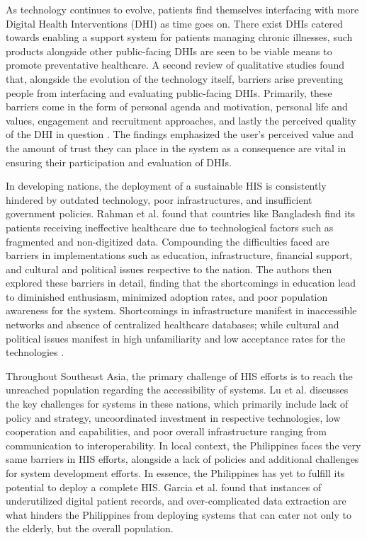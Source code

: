 \documentclass[11pt,a4paper,titlepage]{article}
\begin{document}
	As technology continues to evolve, patients find themselves interfacing with more Digital Health Interventions (DHI) as time goes on. There exist DHIs catered towards enabling a support system for patients managing chronic illnesses, such products alongside other public-facing DHIs are seen to be viable means to promote preventative healthcare. A second review of qualitative studies found that, alongside the evolution of the technology itself, barriers arise preventing people from interfacing and evaluating public-facing DHIs. Primarily, these barriers come in the form of personal agenda and motivation, personal life and values, engagement and recruitment approaches, and lastly the perceived quality of the DHI in question \cite{oconnor_2016_understanding}. The findings emphasized the user’s perceived value and the amount of trust they can place in the system as a consequence are vital in ensuring their participation and evaluation of DHIs. 
	
	In developing nations, the deployment of a sustainable HIS is consistently hindered by outdated technology, poor infrastructures, and insufficient government policies. Rahman et al. found that countries like Bangladesh find its patients receiving ineffective healthcare due to technological factors such as fragmented and non-digitized data. Compounding the difficulties faced are barriers in implementations such as education, infrastructure, financial support, and cultural and political issues respective to the nation. The authors then explored these barriers in detail, finding that the shortcomings in education lead to diminished enthusiasm, minimized adoption rates, and poor population awareness for the system. Shortcomings in infrastructure manifest in inaccessible networks and absence of centralized healthcare databases; while cultural and political issues manifest in high unfamiliarity and low acceptance rates for the technologies \cite{rahman_2024_healthcare}. 
	
	Throughout Southeast Asia, the primary challenge of HIS efforts is to reach the unreached population regarding the accessibility of systems. Lu et al. \cite{lu_2021_assessment} discusses the key challenges for systems in these nations, which primarily include lack of policy and strategy, uncoordinated investment in respective technologies, low cooperation and capabilities, and poor overall infrastructure ranging from communication to interoperability.  In local context, the Philippines faces the very same barriers in HIS efforts, alongside a lack of policies and additional challenges for system development efforts. In essence, the Philippines has yet to fulfill its potential to deploy a complete HIS. Garcia et al. \cite{garcia_2021_health} found that instances of underutilized digital patient records, and over-complicated data extraction are what hinders the Philippines from deploying systems that can cater not only to the elderly, but the overall population. 
	
\end{document}
